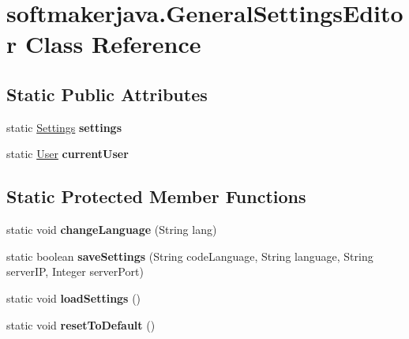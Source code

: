 \hypertarget{classsoftmakerjava_1_1_general_settings_editor}{}\section{softmakerjava.\+General\+Settings\+Editor Class Reference}
\label{classsoftmakerjava_1_1_general_settings_editor}
\subsection*{Static Public Attributes}
\begin{DoxyCompactItemize}
\item 
static \hyperlink{classsoftmakerjava_1_1_settings}{Settings} {\bfseries settings}\hypertarget{classsoftmakerjava_1_1_general_settings_editor_adb0741d1b90e277f06ae10823264973c}{}\label{classsoftmakerjava_1_1_general_settings_editor_adb0741d1b90e277f06ae10823264973c}

\item 
static \hyperlink{classsoftmakerjava_1_1_user}{User} {\bfseries current\+User}\hypertarget{classsoftmakerjava_1_1_general_settings_editor_a62291204138033e59c2f87e317e59a90}{}\label{classsoftmakerjava_1_1_general_settings_editor_a62291204138033e59c2f87e317e59a90}

\end{DoxyCompactItemize}
\subsection*{Static Protected Member Functions}
\begin{DoxyCompactItemize}
\item 
static void {\bfseries change\+Language} (String lang)\hypertarget{classsoftmakerjava_1_1_general_settings_editor_a26f9dd0c0342e02e5a5731832e967ffa}{}\label{classsoftmakerjava_1_1_general_settings_editor_a26f9dd0c0342e02e5a5731832e967ffa}

\item 
static boolean {\bfseries save\+Settings} (String code\+Language, String language, String server\+IP, Integer server\+Port)\hypertarget{classsoftmakerjava_1_1_general_settings_editor_ae16606b6644d56e68e1cf909576d22f5}{}\label{classsoftmakerjava_1_1_general_settings_editor_ae16606b6644d56e68e1cf909576d22f5}

\item 
static void {\bfseries load\+Settings} ()\hypertarget{classsoftmakerjava_1_1_general_settings_editor_ae12dad63b8bc506d97dfdae617f89672}{}\label{classsoftmakerjava_1_1_general_settings_editor_ae12dad63b8bc506d97dfdae617f89672}

\item 
static void {\bfseries reset\+To\+Default} ()\hypertarget{classsoftmakerjava_1_1_general_settings_editor_ab68ece24d8b52b3461b5d994e605ddce}{}\label{classsoftmakerjava_1_1_general_settings_editor_ab68ece24d8b52b3461b5d994e605ddce}

\end{DoxyCompactItemize}
